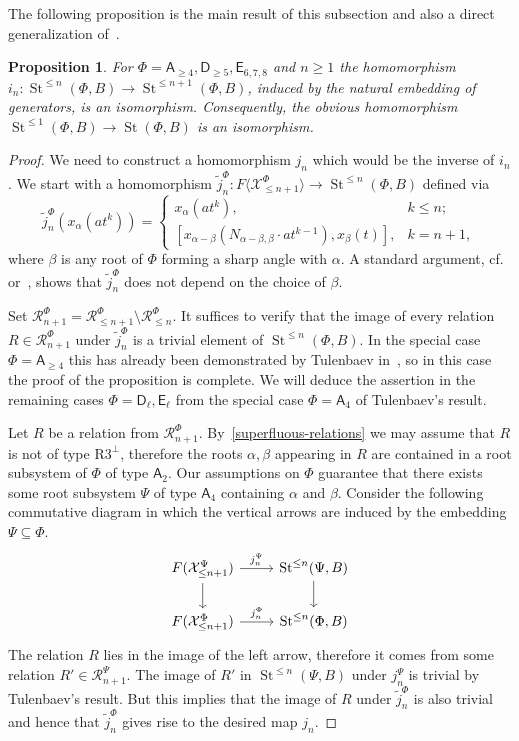 \documentclass[10pt,a4paper,twoside]{article}
\newtheorem{prop}[lemma]{Proposition}
\theoremstyle{remark}
\theoremstyle{definition}
\numberwithin{lemma}{section}
\numberwithin{prop}{section}
\numberwithin{corollary}{section}
\numberwithin{externaltheorem}{section}
\DeclareMathOperator{\St}{St}
\newcommand{\rA}{\mathsf{A}}
\newcommand{\rD}{\mathsf{D}}
\newcommand{\rE}{\mathsf{E}}
\numberwithin{equation}{section}
\begin{document}
The following proposition is the main result of this subsection and also a direct generalization of~\cite[Lemma~3.3]{Tu83}.
\begin{prop} \label{lemma33} For $\Phi=\rA_{\geq 4}, \rD_{\geq 5}, \rE_{6,7,8}$ and $n \geq 1$ the homomorphism $i_n\colon \St^{\leq n}(\Phi, B) \to \St^{\leq n+1}(\Phi, B)$, induced by the natural embedding of generators, is an isomorphism. Consequently, the obvious homomorphism $\St^{\leq 1}(\Phi, B) \to \St(\Phi, B)$ is an isomorphism. \end{prop}
\begin{proof}
 We need to construct a homomorphism $j_n$ which would be the inverse of $i_n$. 
 We start with a homomorphism $\widetilde{j}_n^\Phi \colon F\langle \mathcal{X}^\Phi_{\leq n+1} \rangle \to \St^{\leq n}(\Phi, B)$ defined via
 \[ \widetilde{j}^{\Phi}_n(x_\alpha(at^k)) = \begin{cases} x_\alpha(at^k), & k\leq n; \\
      [x_{\alpha - \beta} (N_{\alpha-\beta, \beta} \cdot at^{k-1}), x_{\beta}(t)], & k = n+1, \end{cases} \]
 where $\beta$ is any root of $\Phi$ forming a sharp angle with $\alpha$.
 A standard argument, cf. \cite[Proposition~1.1]{Re75} or~\cite[Proposition~3.2.2]{RS76}, shows that $\widetilde{j}^\Phi_n$ does not depend on the choice of $\beta$.
  
 Set $\mathcal{R}^\Phi_{n+1} = \mathcal{R}^\Phi_{\leq n+1} \setminus \mathcal{R}^\Phi_{\leq n}$. It suffices to verify that the image of every relation $R \in \mathcal{R}^\Phi_{n+1}$ under $\widetilde{j}^\Phi_n$ is a trivial element of $\St^{\leq n}(\Phi, B)$. In the special case $\Phi=\rA_{\geq 4}$ this has already been demonstrated by Tulenbaev in~\cite[Lemma~3.3]{Tu83}, so in this case the proof of the proposition is complete. We will deduce the assertion in the remaining cases $\Phi=\rD_\ell,\rE_\ell$ from the special case $\Phi=\rA_4$ of Tulenbaev's result.
 
 Let $R$ be a relation from $\mathcal{R}^\Phi_{n+1}$. By~\cref{superfluous-relations} we may assume that $R$ is not of type $\text{R3}^\bot$, therefore the roots $\alpha, \beta$ appearing in $R$ are contained in a root subsystem of $\Phi$ of type $\rA_2$. Our assumptions on $\Phi$ guarantee that there exists some root subsystem $\Psi$ of type $\rA_4$ containing $\alpha$ and $\beta$. Consider the following commutative diagram in which the vertical arrows are induced by the embedding $\Psi\subseteq\Phi$. 
 \[\begin{tikzcd} F(\mathcal{X}_{\leq n+1}^\Psi) \arrow{r}{j_n^\Psi} \arrow{d} & \St^{\leq n}(\Psi, B) \arrow{d} \\ F(\mathcal{X}_{\leq n+1}^\Phi) \arrow{r}{j_n^\Phi} & \St^{\leq n}(\Phi, B) \end{tikzcd} \]  
The relation $R$ lies in the image of the left arrow, therefore it comes from some relation $R' \in \mathcal{R}^\Psi_{n+1}$. The image of $R'$ in $\St^{\leq n}(\Psi, B)$ under $j_n^\Psi$ is trivial by Tulenbaev's result. But this implies that the image of $R$ under $\widetilde{j}_n^\Phi$ is also trivial and hence that $\widetilde{j}_n^\Phi$ gives rise to the desired map $j_n$.
\end{proof}
\end{document}

